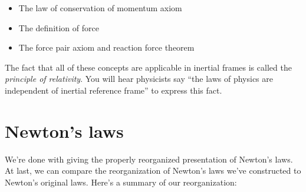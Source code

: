 \documentclass{article}
\begin{document}
\begin{itemize}
	\item The law of conservation of momentum axiom
	\item The definition of force
	\item The force pair axiom and reaction force theorem
\end{itemize}

The fact that all of these concepts are applicable in inertial frames is called the \textit{principle of relativity}. You will hear physicists say ``the laws of physics are independent of inertial reference frame'' to express this fact.

\section*{Newton's laws}

We're done with giving the properly reorganized presentation of Newton's laws. At last, we can compare the reorganization of Newton's laws we've constructed to Newton's original laws. Here's a summary of our reorganization:
\end{document}
